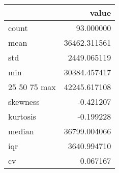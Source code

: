 \begin{tabular}{lr}
\toprule
 & value \\
\midrule
count & 93.000000 \\
mean & 36462.311561 \\
std & 2449.065119 \\
min & 30384.457417 \\
25%
50%
75%
max & 42245.617108 \\
skewness & -0.421207 \\
kurtosis & -0.199228 \\
median & 36799.004066 \\
iqr & 3640.994710 \\
cv & 0.067167 \\
\bottomrule
\end{tabular}
